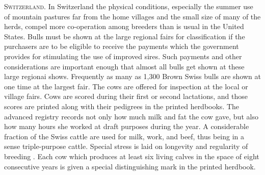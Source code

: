 \textsc{Switzerland}. In Switzerland the physical conditions, especially the
summer use of mountain pastures far from the home villages and the
small size of many of the herds, compel more co-operation among
breeders than is usual in the United States. Bulls must be shown at the
large regional fairs for classification if the purchasers are to be eligible
to receive the payments which the government provides for stimulating
the use of improved sires. Such payments and other considerations are
important enough that almost all bulls get shown at these large regionai
shows. Frequently as many as 1,300 Brown Swiss bulls are shown at one
time at the largest fair. The cows are offered for inspection at the local
or village fairs. Cows are scored during their first or second lactations,
and those scores are printed along with their pedigrees in the printed
herdbooks. The advanced registry records not only how much milk and
fat the cow gave, but also how many hours she worked at draft purposes
during the year. A considerable fraction of the Swiss cattle are used for
milk, work, and beef, thus being in a sense triple-purpose cattle. Special
stress is laid on longevity and regularity of breeding . Each cow which
produces at least six living calves in the space of eight consecutive years
is given a special distinguishing mark in the printed herdbook.


